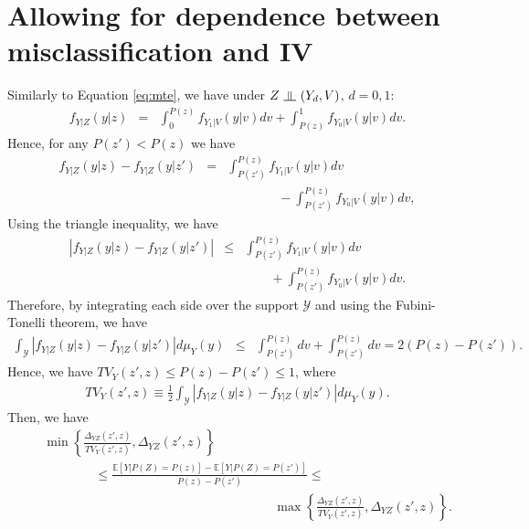 \documentclass[11pt,reqno]{amsart}
\newcommand{\indep}{\rotatebox[origin=c]{90}{$\models$}}
\theoremstyle{plain}
\numberwithin{equation}{section}
\begin{document}
\section{Allowing for dependence between misclassification and IV}\label{apx:zeps}

Similarly to Equation \ref{eq:mte}, we have under $Z\ \indep\ (Y_d, V)$, $d=0,1$:
\begin{eqnarray*}
f_{Y \vert Z}\left(y\vert z\right)
&=&  \int^{P(z)}_0 f_{Y_1\vert V}\left(y \vert v \right)dv + \int_{P(z)}^1f_{Y_0 \vert V}\left(y \vert v \right)dv.
\end{eqnarray*}
Hence, for any $P(z') < P(z)$ we have
\begin{eqnarray*}
f_{Y \vert Z}\left(y\vert z\right) - f_{Y\vert Z}\left(y \vert z'\right)&=& \int^{P(z)}_{P(z')}f_{Y_1\vert V}(y \vert v)dv\\
&&\qquad \qquad - \int^{P(z)}_{P(z')}f_{Y_0 \vert V}(y \vert v)dv,
\end{eqnarray*}
Using the triangle inequality, we have
\begin{eqnarray*}
\left \lvert f_{Y \vert Z}\left(y \vert z\right) - f_{Y \vert Z}\left(y \vert z'\right) \right \rvert  &\leq&  \int^{P(z)}_{P(z')}f_{Y_1 \vert V}(y \vert v)dv\\
 && \qquad + \int^{P(z)}_{P(z')}f_{Y_0\vert V}(y \vert v)dv.
\end{eqnarray*}
Therefore, by integrating each side over the support $\mathcal Y$ and using the Fubini-Tonelli theorem, we have
\begin{eqnarray*}
\int_{\mathcal Y}\left \lvert f_{Y \vert Z}\left(y \vert z\right) - f_{Y \vert Z}\left(y \vert z'\right) \right \rvert d \mu_{Y}(y) &\leq&  \int^{P(z)}_{P(z')} dv+\int^{P(z)}_{P(z')}dv= 2\left(P(z)-P(z')\right).
\end{eqnarray*}
Hence, we have $TV_{Y}(z',z) \leq P(z)-P(z') \leq 1$, where 
\begin{eqnarray*}
TV_{Y}(z',z) \equiv \frac{1}{2} \int_{\mathcal Y}\left \lvert f_{Y \vert Z}\left(y \vert z\right) - f_{Y \vert Z}\left(y \vert z'\right) \right \rvert d \mu_{Y}(y).
\end{eqnarray*}
Then, we have 
\begin{eqnarray*}
&& \min\left\{\frac{\Delta_{YZ}(z',z)}{TV_{Y}(z',z)},  \Delta_{YZ}(z',z) \right\}\\
&& \qquad \qquad \leq \frac{\mathbb E[Y\vert P(Z)=P(z)]-\mathbb E[Y\vert P(Z)=P(z')]}{P(z)-P(z')} \leq \\
&& \qquad \qquad \qquad \qquad \qquad \qquad \qquad \qquad \qquad \max\left\{\frac{\Delta_{YZ}(z',z)}{TV_{Y}(z',z)},  \Delta_{YZ}(z',z)\right\}.
\end{eqnarray*}
\end{document}
